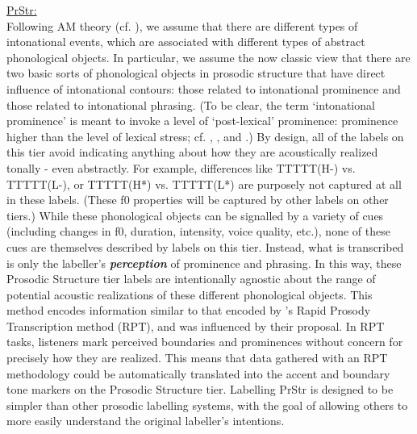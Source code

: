 \documentclass[11pt, twoside]{memoir}
\begin{document}
\uline{PrStr:}\\ Following AM theory (cf. \citealt{pierrehumbert80}), we assume that there are different types of intonational events, which are associated with different types of abstract phonological objects. In particular, we assume the now classic view that there are two basic sorts of phonological objects in prosodic structure that have direct influence of intonational contours: those related to intonational prominence and those related to intonational phrasing. (To be clear, the term ‘intonational prominence’ is meant to invoke a level of ‘post-lexical’ prominence: prominence higher than the level of lexical stress; cf. \citealt{bolinger58}, \citealt{libermanprince77}, and \citealt{beckmanedwards94}.) By design, all of the labels on this tier avoid indicating anything about how they are acoustically realized tonally - even abstractly. For example, differences like TTTTT(H-) vs. TTTTT(L-), or TTTTT(H*) vs. TTTTT(L*) are purposely not captured at all in these labels. (These f0 properties will be captured by other labels on other tiers.) While these phonological objects can be signalled by a variety of cues (including changes in f0, duration, intensity, voice quality, etc.), none of these cues are themselves described by labels on this tier. Instead, what is transcribed is only the labeller’s \textit{\textbf{perception}} of prominence and phrasing. In this way, these Prosodic Structure tier labels are intentionally agnostic about the range of potential acoustic realizations of these different phonological objects. This method encodes information similar to that encoded by \citeauthor{cole-14}’s \citeyear{cole-14} Rapid Prosody Transcription method (RPT), and was influenced by their proposal. In RPT tasks, listeners mark perceived boundaries and prominences without concern for precisely how they are realized. This means that data gathered with an RPT methodology could be automatically translated into the accent and boundary tone markers on the Prosodic Structure tier. Labelling PrStr is designed to be simpler than other prosodic labelling systems, with the goal of allowing others to more easily understand the original labeller’s intentions.
\end{document}
